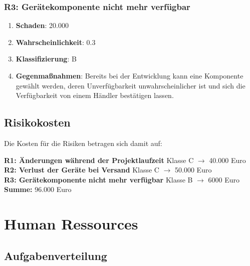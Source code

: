 \subsubsection{R3: Gerätekomponente nicht mehr verfügbar}
\begin{enumerate}
	\item \textbf{Schaden}: 20.000
	\item \textbf{Wahrscheinlichkeit}: 0.3
	\item \textbf{Klassifizierung}: B
	\item \textbf{Gegenmaßnahmen}: Bereits bei der Entwicklung kann eine Komponente gewählt werden, deren Unverfügbarkeit unwahrscheinlicher ist und sich die Verfügbarkeit von einem Händler bestätigen lassen.
\end{enumerate}

\subsection{Risikokosten}

Die Kosten für die Risiken betragen sich damit auf:

\textbf{R1: Änderungen während der Projektlaufzeit} Klasse C  $\rightarrow$ 40.000 Euro\\
\textbf{R2: Verlust der Geräte bei Versand} Klasse C  $\rightarrow$ 50.000 Euro\\
\textbf{R3: Gerätekomponente nicht mehr verfügbar} Klasse B  $\rightarrow$ 6000 Euro\\
\textbf{Summe:} 96.000 Euro

\section{Human Ressources}
\subsection{Aufgabenverteilung}

